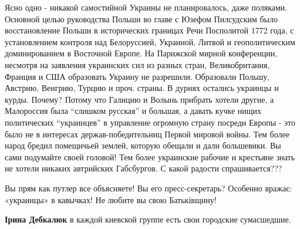 \begin{itemize}
Ясно одно - никакой самостийной Украины не планировалось, даже
поляками. Основной целью руководства Польши во главе с Юзефом Пилсудским было
восстановление Польши в исторических границах Речи Посполитой 1772 года, с
установлением контроля над Белоруссией, Украиной, Литвой и геополитическим
доминированием в Восточной Европе. На Парижской мирной конференции, несмотря на
заявления украинских сил из разных стран, Великобритания, Франция и США
образовать Украину не разрешили. Образовали Польшу, Австрию, Венгрию, Турцию и
проч. страны. В дурнях остались украинцы и курды. Почему? Потому что Галицию и
Волынь прибрать хотели другие, а Малороссия была \enquote{слишком русская} и большая, а
давать кучке нищих политических \enquote{украинцев} в управление огромную страну
посреди Европы - это было не в интересах держав-победительниц Первой мировой
войны. Тем более народ бредил помещичьей землей, которую обещали и дали
большевики. Вы сами подумайте своей головой! Тем более украинские рабочие и
крестьяне знать не хотели никаких автрийских Габсбургов. С какой радости
спрашивается???

\begin{itemize} %

Вы прям как путлер все объясняете! Вы его пресс-секретарь? Особенно вражає:
«украинцы» в кавычках! Не любите вы свою Батьківщину!

\textbf{Ірина Дебкалюк} в каждой киевской группе есть свои городские сумасшедшие.
\end{itemize} %


\end{itemize} %
